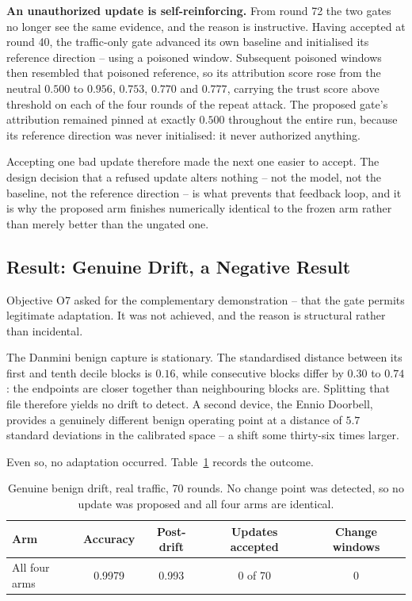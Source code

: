 \documentclass[12pt,a4paper]{report}
\begin{document}
\textbf{An unauthorized update is self-reinforcing.} From round 72 the two gates
no longer see the same evidence, and the reason is instructive. Having accepted
at round 40, the traffic-only gate advanced its own baseline and initialised its
reference direction -- using a poisoned window. Subsequent poisoned windows then
resembled that poisoned reference, so its attribution score rose from the neutral
$0.500$ to $0.956$, $0.753$, $0.770$ and $0.777$, carrying the trust score above
threshold on each of the four rounds of the repeat attack. The proposed gate's
attribution remained pinned at exactly $0.500$ throughout the entire run, because
its reference direction was never initialised: it never authorized anything.

Accepting one bad update therefore made the next one easier to accept. The design
decision that a refused update alters nothing -- not the model, not the baseline,
not the reference direction -- is what prevents that feedback loop, and it is why
the proposed arm finishes numerically identical to the frozen arm rather than
merely better than the ungated one.

\subsection{Result: Genuine Drift, a Negative Result}

Objective O7 asked for the complementary demonstration -- that the gate permits
legitimate adaptation. It was not achieved, and the reason is structural rather
than incidental.

The Danmini benign capture is stationary. The standardised distance between its
first and tenth decile blocks is $0.16$, while consecutive blocks differ by
$0.30$ to $0.74$: the endpoints are closer together than neighbouring blocks are.
Splitting that file therefore yields no drift to detect. A second device, the
Ennio Doorbell, provides a genuinely different benign operating point at a
distance of $5.7$ standard deviations in the calibrated space -- a shift some
thirty-six times larger.

Even so, no adaptation occurred. Table~\ref{tab:drift} records the outcome.

\begin{table}[htbp]
\centering
\caption{Genuine benign drift, real traffic, 70 rounds. No change point was
detected, so no update was proposed and all four arms are identical.}
\label{tab:drift}
\small
\begin{tabular}{@{}lcccc@{}}
\toprule
\textbf{Arm} & \textbf{Accuracy} & \textbf{Post-drift} &
\textbf{Updates accepted} & \textbf{Change windows}\\
\midrule
All four arms & 0.9979 & 0.993 & 0 of 70 & 0\\
\bottomrule
\end{tabular}
\end{table}
\end{document}
